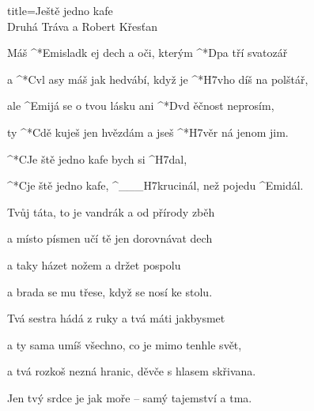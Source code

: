 \begin{song}{title=\predtitle\centering Ještě jedno kafe  \\\large Druhá Tráva a Robert Křesťan  \vspace*{-0.3cm}}  %
\begin{centerjustified}
\nejnejvetsi

\sloka 
	Máš ^*{Emi}sladk ej dech a oči, kterým ^*{D}pa tří svatozář

	a ^*{C}vl asy máš jak hedvábí, když je ^*{H7}vho díš na polštář,

	ale ^{Emi}já se o tvou lásku ani ^*{D}vd ěčnost neprosím,

	ty ^*{C}dě kuješ jen hvězdám a jseš ^*{H7}věr ná jenom jim.

	^*{C}Je ště jedno kafe bych si ^{H7}dal,

	^*{C}je ště jedno kafe, ^{{\color{white}\_\_\_}H7}krucinál, než pojedu ^{Emi}dál.

\sloka
	Tvůj táta, to je vandrák a od přírody zběh
	
	a místo písmen učí tě jen dorovnávat dech
	
	a taky házet nožem a držet pospolu
   
	a brada se mu třese, když se nosí ke stolu.



\sloka
	Tvá sestra hádá z ruky a tvá máti jakbysmet
	
	a ty sama umíš všechno, co je mimo tenhle svět,
	
	a tvá rozkoš nezná hranic, děvče s hlasem skřivana.
	
	Jen tvý srdce je jak moře -- samý tajemství a tma.



\end{centerjustified}
\setcounter{Slokočet}{0}
\end{song}
